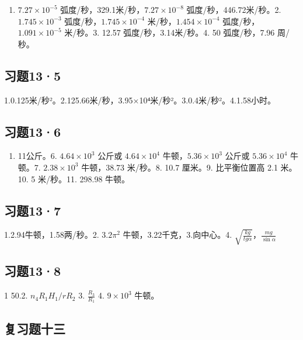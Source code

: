 \begin{enumerate}
\def\labelenumi{\arabic{enumi}.}
\tightlist
\item
  \(7.27 \times 10^{-5}\) 弧度/秒，329.1米/秒，\(7.27 \times 10^{-8}\)
  弧度/秒，446.72米/秒。2. \(1.745 \times 10^{-3}\)
  弧度/秒，\(1.745 \times 10^{-4}\) 米/秒，\(1.454 \times 10^{-4}\)
  弧度/秒，\(1.091 \times 10^{-5}\) 米/秒。3. 12.57
  弧度/秒，3.14米/秒。4. 50 弧度/秒，7.96 周/秒。
\end{enumerate}

\subsection{习题13·5}\label{ux4e60ux9898135-1}

1.0.125米/秒²。2.125.66米/秒，3.95×10⁴米/秒²。3.0.4米/秒²。4.1.58小时。

\subsection{习题13·6}\label{ux4e60ux9898136-1}

\begin{enumerate}
\def\labelenumi{\arabic{enumi}.}
\setcounter{enumi}{4}
\tightlist
\item
  11公斤。6. \(4.64 \times 10^{3}\) 公斤或 \(4.64 \times 10^{4}\)
  牛顿，\(5.36 \times 10^{3}\) 公斤或 \(5.36 \times 10^{4}\) 牛顿。7.
  \(2.38 \times 10^{3}\) 牛顿，38.73 米/秒。8. 10.7 厘米。9.
  比平衡位置高 2.1 米。10. 5 米/秒。11. 298.98 牛顿。
\end{enumerate}

\subsection{习题13·7}\label{ux4e60ux9898137-1}

1.2.94牛顿，1.58两/秒。2. \(3.2\pi^2\) 牛顿，3.22千克，3.向中心。4.
\(\sqrt{\frac{kg}{tg\alpha}}\)，\(\frac{mg}{\sin\alpha}\)

\subsection{习题13·8}\label{ux4e60ux9898138-1}

1 50.2. \(n_{4}R_{1}H_{1}/rR_{2}\) 3. \(\frac{R_3}{R_1}\) 4.
\(9\times 10^{3}\) 牛顿。

\subsection{复习题十三}\label{ux590dux4e60ux9898ux5341ux4e09-1}

